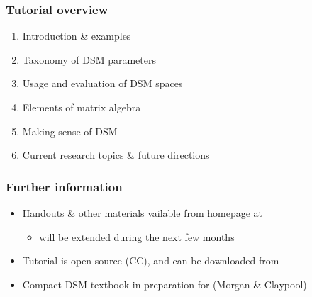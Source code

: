 \begin{frame}
  \frametitle{Tutorial overview}

  \begin{enumerate}
  \item Introduction \& examples
  \item Taxonomy of DSM parameters
  \item Usage and evaluation of DSM spaces
  \item Elements of matrix algebra
  \item Making sense of DSM
  \item Current research topics \& future directions
  \end{enumerate}

  \gap[2]
\end{frame}

\begin{frame}
  \frametitle{Further information}

  \begin{itemize}
  \item Handouts \& other materials vailable from homepage at
    \begin{center}
    \end{center}
    \begin{itemize}
    \item[\hand] will be extended during the next few months
    \end{itemize}
  \item Tutorial is open source (CC), and can be downloaded from
    \begin{center}\footnotesize
    \end{center}
  \item Compact DSM textbook in preparation for  (Morgan \& Claypool)
  \end{itemize}

  \gap[1]
  \begin{center}
    \setlength{\fboxrule}{1pt}
  \end{center}
\end{frame}

